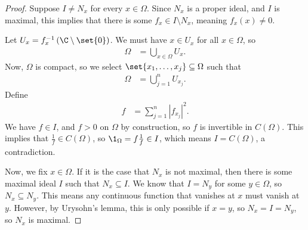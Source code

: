 \documentclass[10pt]{mypackage}
\begin{document}
\begin{proof}
  Suppose $I\neq N_x$ for every $x\in \Omega$. Since $N_x$ is a proper ideal, and $I$ is maximal, this implies that there is some $f_x\in I\setminus N_x$, meaning $f_x\left(x\right) \neq 0$.\newline

  Let $U_x = f_x^{-1}\left(\C\setminus \set{0}\right)$. We must have $x\in U_x$ for all $x\in \Omega$, so
  \begin{align*}
    \Omega &= \bigcup_{x\in \Omega}U_x.
  \end{align*}
  Now, $\Omega$ is compact, so we select $\set{x_1,\dots,x_j}\subseteq \Omega$ such that
  \begin{align*}
    \Omega &= \bigcup_{j=1}^{n}U_{x_j}.
  \end{align*}
  Define
  \begin{align*}
    f &= \sum_{j=1}^{n}\left\vert f_{x_j} \right\vert^2.
  \end{align*}
  We have $f\in I$, and $f > 0$ on $\Omega$ by construction, so $f$ is invertible in $C\left(\Omega\right)$. This implies that $\frac{1}{f}\in C\left(\Omega\right)$, so $\1_{\Omega} = f\frac{1}{f} \in I$, which means $I = C\left(\Omega\right)$, a contradiction.\newline

  Now, we fix $x\in \Omega$. If it is the case that $N_x$ is not maximal, then there is some maximal ideal $I$ such that $N_x\subseteq I$. We know that $I = N_y$ for some $y\in \Omega$, so $N_x\subseteq N_y$. This means any continuous function that vanishes at $x$ must vanish at $y$. However, by Urysohn's lemma, this is only possible if $x = y$, so $N_x = I = N_y$, so $N_x$ is maximal.
\end{proof}
\end{document}

